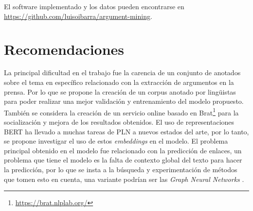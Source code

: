 \documentclass[a4paper,11pt,twocolumn,twoside]{article}
\begin{document}

El software implementado y los datos pueden encontrarse en \url{https://github.com/luisoibarra/argument-mining}.

\section{Recomendaciones}

La principal dificultad en el trabajo fue la carencia de un conjunto de anotados
sobre el tema en específico relacionado con la extracción de argumentos en la prensa.
Por lo que se propone la creación de un corpus anotado por lingüistas para poder realizar una mejor 
validación y entrenamiento del modelo propuesto. También se considera la creación de un servicio 
online basado en Brat\footnote{\url{https://brat.nlplab.org/}} para la socialización y mejora de 
los resultados obtenidos.
El uso de representaciones BERT ha llevado a muchas tareas de PLN a nuevos estados 
del arte, por lo tanto, se propone investigar el uso de estos \textit{embeddings} en 
el modelo. El problema principal obtenido en el modelo fue relacionado con la 
predicción de enlaces, un problema que tiene el modelo es la falta de contexto global
del texto para hacer la predicción, por lo que se insta a la búsqueda y experimentación
de métodos que tomen esto en cuenta, una variante podrían ser las \textit{Graph Neural Networks} \cite{wu2021comprehensive}.
\end{document}
